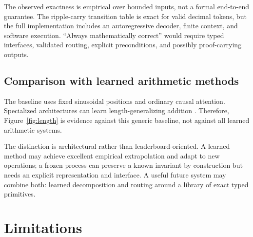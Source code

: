 \documentclass[11pt]{article}
\begin{document}
The observed exactness is empirical over bounded inputs, not a formal
end-to-end guarantee. The ripple-carry transition table is exact for valid
decimal tokens, but the full implementation includes an autoregressive decoder,
finite context, and software execution. ``Always mathematically correct'' would
require typed interfaces, validated routing, explicit preconditions, and
possibly proof-carrying outputs.

\subsection{Comparison with learned arithmetic methods}

The baseline uses fixed sinusoidal positions and ordinary causal attention.
Specialized architectures can learn length-generalizing addition
\cite{jelassi2023length,cho2024position,duan2023interpolation}. Therefore,
Figure~\ref{fig:length} is evidence against this generic baseline, not against
all learned arithmetic systems.

The distinction is architectural rather than leaderboard-oriented. A learned
method may achieve excellent empirical extrapolation and adapt to new
operations; a frozen process can preserve a known invariant by construction
but needs an explicit representation and interface. A useful future system may
combine both: learned decomposition and routing around a library of exact
typed primitives.

\section{Limitations}
\end{document}
